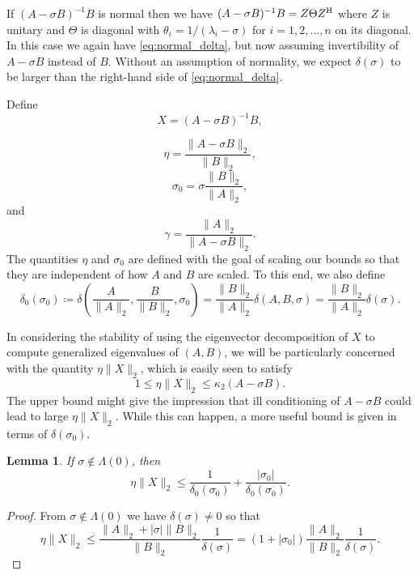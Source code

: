 \documentclass[12pt]{article}
\def\H{{\rm H}}
\newtheorem{lemma}{Lemma}
\begin{document}
If $(A-\sigma B)^{-1}B$ is normal then we have
$(A-\sigma B)^{-1}B = Z \Theta Z^\H$ where $Z$ is unitary and $\Theta$
is diagonal with $\theta_i = 1/(\lambda_i - \sigma)$ for
$i=1,2,\ldots, n$ on its diagonal.  In this case we again have
\eqref{eq:normal_delta}, but now assuming invertibility of
$A-\sigma B$ instead of $B$.  Without an assumption of normality, we
expect $\delta(\sigma)$ to be larger than the right-hand side of
\eqref{eq:normal_delta}.

Define
\begin{equation}
  \label{eq:Xdef}
  X = (A-\sigma B)^{-1} B,
\end{equation}

\begin{equation}
  \label{eq:eta_def}
  \eta = \frac{\|A-\sigma B\|_2}{\|B\|_2},
\end{equation}
\begin{equation}
  \label{eq:sigma0_def}
  \sigma_0 = \sigma \frac{\|B\|_2}{\|A\|_2},
\end{equation}
and
\begin{equation}
  \label{eq:gamma_def}
  \gamma = \frac{\|A\|_2}{\|A-\sigma B\|_2}.
\end{equation}
The quantities $\eta$ and $\sigma_0$ are defined with the goal of
scaling our bounds so that they are independent of how $A$ and $B$ are
scaled.  To this end, we also define
\begin{equation*}
  \delta_0(\sigma_0) \coloneqq \delta\left(\frac{A}{\|A\|_2}, \frac{B}{\|B\|_2}, \sigma_0 \right) =
  \frac{\|B\|_2}{\|A\|_2} \delta(A, B, \sigma)=\frac{\|B\|_2}{\|A\|_2} \delta(\sigma).
\end{equation*}

In considering the stability of using the eigenvector decomposition of $X$
to compute generalized eigenvalues of $(A,B)$, we will be particularly concerned with
the quantity $\eta \|X\|_2$, which is easily seen to satisfy
\begin{equation*}
  1 \leq \eta \|X\|_2 \leq \kappa_2(A-\sigma B).
\end{equation*}
The upper bound might give the impression that ill conditioning of
$A-\sigma B$ could lead to large $\eta \|X\|_2$.  While this can happen,
a more useful bound is given in terms of $\delta(\sigma_0)$.
\begin{lemma}
  \label{lm:eta_X_bound}
  If $\sigma \notin \Lambda(0)$, then
  \begin{equation*}
    \eta \|X\|_2 \leq \frac{1}{\delta_0(\sigma_0)} + \frac{|\sigma_0|}{\delta_0(\sigma_0)}.
  \end{equation*}
\end{lemma}
\begin{proof}
  From $\sigma \notin \Lambda(0)$ we have $\delta(\sigma)\neq 0$ so that
  \begin{equation*}
    \eta \|X\|_2
    \leq \frac{\|A\|_2 + |\sigma| \|B\|_2}{\|B\|_2} \frac{1}{\delta(\sigma)}
    = (1 + |\sigma_0|) \frac{\|A\|_2}{\|B\|_2} \frac{1}{\delta(\sigma)}.
  \end{equation*}
\end{proof}
\end{document}
